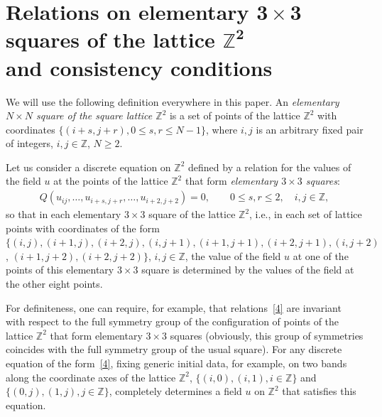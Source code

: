 \documentclass[11pt]{article}
\begin{document}
\section[Relations on elementary $3 \times 3$ squares of the
lattice $\mathbb{Z}^2$ and consistency conditions]{Relations on elementary $\boldsymbol{3 \times 3}$ squares of the
lattice $\boldsymbol{\mathbb{Z}^2}$\\ and consistency conditions}



We will use the following def\/inition everywhere in this paper. An
{\it elementary $N \times N$ square of the square lattice
$\mathbb{Z}^2$} is a set of points of the lattice $\mathbb{Z}^2$
with coordinates $\{(i + s, j + r), 0 \leq s, r \leq N - 1\}$,
where $i, j$ is an arbitrary f\/ixed pair of integers, $i, j \in
\mathbb{Z}$, $N \geq 2$.





Let us consider a discrete equation on $\mathbb{Z}^2$ def\/ined by a
relation for the values of the f\/ield $u$ at the points of the
lattice $\mathbb{Z}^2$ that form {\it elementary $3 \times 3$
squares}:
\begin{gather} Q (u_{i j}, \ldots, u_{i + s, j + r}, \ldots, u_{i +
2, j + 2}) = 0, \qquad  0 \leq s, r \leq 2, \quad i, j \in \mathbb{Z},
\label{4}\end{gather}
so that in each elementary $3 \times 3$ square of the
lattice $\mathbb{Z}^2$, i.e., in each set of lattice points with
coordinates of the form $\{(i, j), (i + 1, j), (i + 2, j), (i, j +
1), (i + 1, j + 1), (i + 2, j + 1), (i, j + 2)$, $(i + 1, j + 2), (i +
2, j + 2)\}$, $i, j \in \mathbb{Z}$, the value of the f\/ield $u$ at
one of the points of this elementary $3 \times 3$ square is
determined by the values of the f\/ield at the other eight points.


For def\/initeness, one can require, for example, that relations~\eqref{4}
are invariant with respect to the full symmetry group of
the conf\/iguration of points of the lattice $\mathbb{Z}^2$ that form
elementary $3 \times 3$ squares (obviously, this group of symmetries
coincides with the full symmetry group of the usual square). For any
discrete equation of the form~\eqref{4}, f\/ixing generic initial
data, for example, on two bands along the coordinate axes of the
lattice $\mathbb{Z}^2$, $\{(i, 0), (i, 1), i \in \mathbb{Z} \}$ and
$\{(0, j), (1, j), j \in \mathbb{Z} \}$, completely determines a
f\/ield $u$ on $\mathbb{Z}^2$ that satisf\/ies this equation.
\end{document}

